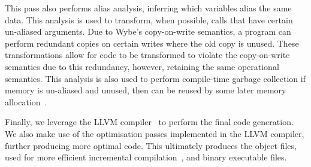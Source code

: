 This pass also performs alias analysis, inferring which variables alias the same data. This analysis is used to transform, when possible, calls that have certain un-aliased arguments. Due to Wybe's copy-on-write semantics, a program can perform redundant copies on certain writes where the old copy is unused. These transformations allow for code to be transformed to violate the copy-on-write semantics due to this redundancy, however, retaining the same operational semantics. This analysis is also used to perform compile-time garbage collection if memory is un-aliased and unused, then can be reused by some later memory allocation~\cite{chen2020multiple}.

Finally, we leverage the LLVM compiler~\cite{lattner2004llvm} to perform the final code generation. We also make use of the optimisation passes implemented in the LLVM compiler, further producing more optimal code. This ultimately produces the object files, used for more efficient incremental compilation~\cite{ranjan2016incremental}, and binary executable files.
